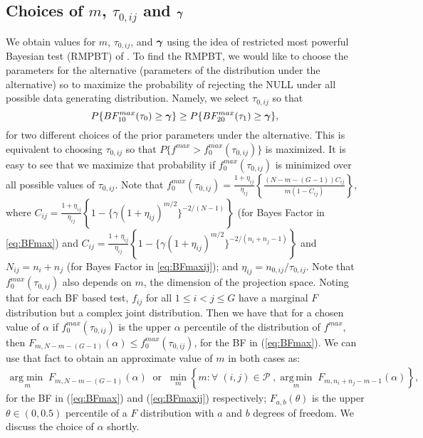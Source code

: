 \documentclass[12pt]{article}
\def\be{\begin{eqnarray}}
\def\ee{\end{eqnarray}}
\newcommand{\ugamma}            {\mbox{\boldmath$\gamma$}}
\DeclareMathOperator*{\argmin}{arg\,min}
\begin{document}
\subsection{Choices of $m$, $\tau_{0,ij}$ and $\ugamma$} \label{sec:testmtaugam}
We obtain values for $m$, $\tau_{0,ij}$, and $\ugamma$ using the idea of restricted most powerful Bayesian test (RMPBT) of \citealp{GoddardJohnson,Goddard}. To find the RMPBT, we would like to choose the parameters for the alternative (parameters of the distribution under the alternative) so to maximize the probability of rejecting the NULL under all possible data generating distribution. Namely, we select $\tau_{0,ij}$ so that
$$P\{BF^{max}_{10}(\tau_0) \geq  \ugamma\} \geq P\{BF^{max}_{20}(\tau_1) \geq \ugamma \},$$
for two different choices of the prior parameters under the alternative.
This is equivalent to choosing $\tau_{0,ij}$ so that  $P\{f^{max} > f^{max}_{0}(\tau_{0,ij})\}$ is maximized.
It is easy to see that we maximize that probability if $f^{max}_{0}(\tau_{0,ij})$ is minimized over all possible values of $\tau_{0,ij}$. Note that $f^{max}_{0}(\tau_{0,ij}) =\frac{1+\eta_{ij}}{\eta_{ij}} \left\{ \frac{(N - m -(G-1))C_{ij}}{m(1 - C_{ij})} \right\}$, where
$C_{ij} = \frac{1+\eta_{ij}}{\eta_{ij}}\left\{ 1 - \{\gamma(1+\eta_{ij})^{m/2} \}^{-2/(N-1)}  \right\}$ (for Bayes Factor in \ref{eq:BFmax}) and $C_{ij} = \frac{1+\eta_{ij}}{\eta_{ij}}\left\{ 1 - \{\gamma(1+\eta_{ij})^{m/2} \}^{-2/(n_i+n_j-1)}  \right\}$ and $N_{ij} = n_i +n_j$ (for Bayes Factor in \ref{eq:BFmaxij}); and $\eta_{ij} = n_{0,ij}/\tau_{0,ij}$. Note that $f^{max}_{0}(\tau_{0,ij})$ also depends on $m$, the dimension of the projection space. Noting that for each BF based test, $f_{ij}$ for all $1 \leq i < j \leq G$ have a marginal $F$ distribution but a complex joint distribution. Then we have that for a chosen value of $\alpha$ if $f^{max}_{0}(\tau_{0,ij})$ is the upper $\alpha$ percentile of the distribution of $f^{max}$, then $F_{m, N-m-(G-1)}(\alpha) \leq f^{max}_{0}(\tau_{0,ij})$, for the BF in (\ref{eq:BFmax}).  We can use that fact to obtain an approximate value of $m$ in both cases as:
\be
 \underset{m}{\mathrm{arg\min}}\; F_{m, N -m -(G-1)}(\alpha)\;\; \mbox{or}\;\; \underset{m}{\mathrm{\min}} \left\{m:\forall\;(i,j) \in\mathcal{P}\;,  \underset{m}{\argmin}\; F_{m, n_i+n_j -m -1}(\alpha) \right\}, \label{eq:mval} 
 \ee
for the BF in (\ref{eq:BFmax}) and (\ref{eq:BFmaxij}) respectively; $F_{a, b}(\theta)$ is the upper $\theta \in (0, 0.5)$ percentile of a $F$ distribution with $a$ and $b$ degrees of freedom. We discuss the choice of $\alpha$ shortly.
\end{document}
